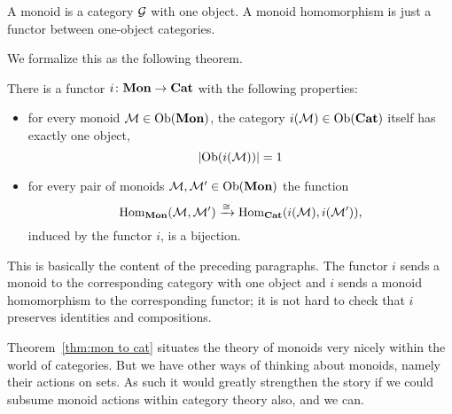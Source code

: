 \documentclass[CT4S-EN-RU]{subfiles}
\begin{document}
\begin{blockRUS}
\end{blockRUS}

\begin{sloganENG}
A monoid is a category $\mathcal{G}$ with one object. A monoid homomorphism is just a functor between one-object categories.
\end{sloganENG}

\begin{sloganRUS}
\end{sloganRUS}

\begin{blockENG}
We formalize this as the following theorem.
\end{blockENG}

\begin{blockRUS}
\end{blockRUS}

\begin{theoremENG}\label{thm:mon to cat}
There is a functor $i\colon{\mathbf{Mon}}\rightarrow{\mathbf{Cat}}$ with the following properties:
\begin{itemize}
\item for every monoid $\mathcal{M}\in\textnormal{Ob}({\mathbf{Mon}})$, the category $i(\mathcal{M})\in\textnormal{Ob}({\mathbf{Cat}})$ itself has exactly one object, $$|\textnormal{Ob}(i(\mathcal{M}))|=1$$ 
\item for every pair of monoids $\mathcal{M},\mathcal{M}'\in\textnormal{Ob}({\mathbf{Mon}})$ the function $$\textnormal{Hom}_{\mathbf{Mon}}(\mathcal{M},\mathcal{M}')\xrightarrow{\cong}\textnormal{Hom}_{\mathbf{Cat}}(i(\mathcal{M}),i(\mathcal{M}')),$$ induced by the functor $i$, is a bijection.
\end{itemize}
\end{theoremENG}

\begin{theoremRUS}\label{thm:mon to cat}
\end{theoremRUS}

\begin{proofENG}
This is basically the content of the preceding paragraphs. The functor $i$ sends a monoid to the corresponding category with one object and $i$ sends a monoid homomorphism to the corresponding functor; it is not hard to check that $i$ preserves identities and compositions.
\end{proofENG}

\begin{proofRUS}
\end{proofRUS}

\begin{blockENG}
Theorem~\ref{thm:mon to cat} situates the theory of monoids very nicely within the world of categories. But we have other ways of thinking about monoids, namely their actions on sets. As such it would greatly strengthen the story if we could subsume monoid actions within category theory also, and we can.
\end{blockENG}
\end{document}

